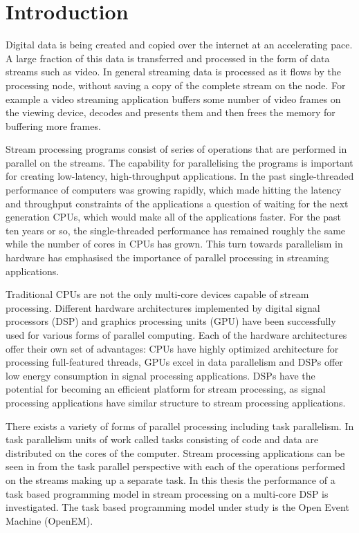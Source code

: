 \chapter{Introduction}
\label{chapter:introduction}
Digital data is being created and copied over the internet at an accelerating pace. A large fraction of this data is transferred and processed in the form of data streams such as video. In general streaming data is processed as it flows by the processing node, without saving a copy of the complete stream on the node. For example a video streaming application buffers some number of video frames on the viewing device, decodes and presents them and then frees the memory for buffering more frames.

Stream processing programs consist of series of operations that are performed in parallel on the streams. The capability for parallelising the programs is important for creating low-latency, high-throughput applications. In the past single-threaded performance of computers was growing rapidly, which made hitting the latency and throughput constraints of the applications a question of waiting for the next generation CPUs, which would make all of the applications faster. For the past ten years or so, the single-threaded performance has remained roughly the same while the number of cores in CPUs has grown. This turn towards parallelism in hardware has emphasised the importance of parallel processing in streaming applications.

Traditional CPUs are not the only multi-core devices capable of stream processing. Different hardware architectures implemented by digital signal processors (DSP) and graphics processing units (GPU) have been successfully used for various forms of parallel computing. Each of the hardware architectures offer their own set of advantages: CPUs have highly optimized architecture for processing full-featured threads, GPUs excel in data parallelism and DSPs offer low energy consumption in signal processing applications. DSPs have the potential for becoming an efficient platform for stream processing, as signal processing applications have similar structure to stream processing applications.

There exists a variety of forms of parallel processing including task parallelism. In task parallelism units of work called tasks consisting of code and data are distributed on the cores of the computer. Stream processing applications can be seen in from the task parallel perspective with each of the operations performed on the streams making up a separate task. In this thesis the performance of a task based programming model in stream processing on a multi-core DSP is investigated. The task based programming model under study is the Open Event Machine (OpenEM).

